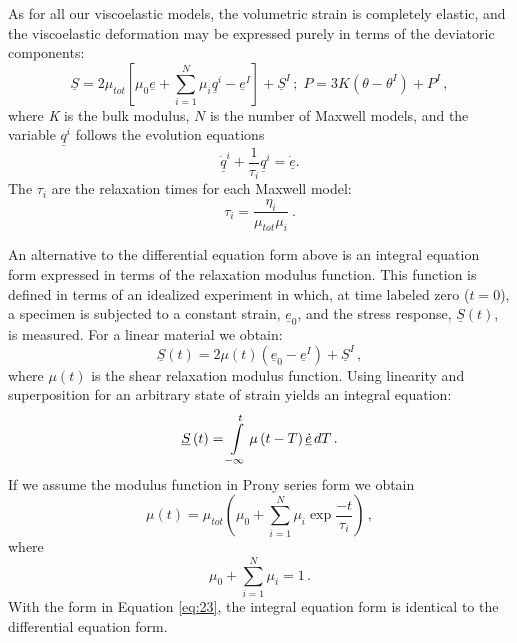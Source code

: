 As for all our viscoelastic models, the volumetric strain is completely
elastic, and the viscoelastic deformation may be expressed purely
in terms of the deviatoric components:
\begin{equation}
\underline{S}=2\mu_{tot}\left[\mu_{0}\underline{e}+\sum_{i=1}^{N}\mu_{i}\underline{q}^{i}-\underline{e}^{I}\right]+\underline{S}^{I}\,;\; P=3K\left(\theta-\theta^{I}\right)+P^{I}\,,\label{eq:19}
\end{equation}
where \textsl{K} is the bulk modulus, $N$ is the number of Maxwell
models, and the variable $\underline{q}^{i}$ follows the evolution
equations
\begin{equation}
\underline{\dot{q}}^{i}+\frac{1}{\tau_{i}}\underline{q}^{i}=\underline{\dot{e}}.\label{eq:20}
\end{equation}
The $\tau_{i}$ are the relaxation times for each Maxwell model:
\begin{equation}
\tau_{i}=\frac{\eta_{i}}{\mu_{tot}\mu_{i}}\:.\label{eq:21-1}
\end{equation}


An alternative to the differential equation form above is an integral
equation form expressed in terms of the relaxation modulus function.
This function is defined in terms of an idealized experiment in which,
at time labeled zero ($t=0$), a specimen is subjected to a constant
strain, $\underline{e}_{0}$, and the stress response, $\underline{S}\left(t\right)$,
is measured. For a linear material we obtain:
\begin{equation}
\underline{S}\left(t\right)=2\mu\left(t\right)\left(\underline{e}_{0}-\underline{e}^{I}\right)+\underline{S}^{I}\,,\label{eq:21}
\end{equation}
where $\mu\left(t\right)$ is the shear relaxation modulus function.
Using linearity and superposition for an arbitrary state of strain
yields an integral equation:
\begin{equation}
\underline{S}\left(t\right)=\intop_{-\infty}^{t}\mu\left(t-T\right)\underline{\dot{e}}\, dT\,.\label{eq:22}
\end{equation}
If we assume the modulus function in Prony series form we obtain
\begin{equation}
\mu\left(t\right)=\mu_{tot}\left(\mu_{0}+\sum_{i=1}^{N}\mu_{i}\exp\frac{-t}{\tau_{i}}\right)\,,\label{eq:23}
\end{equation}
where
\begin{equation}
\mu_{0}+\sum_{i=1}^{N}\mu_{i}=1\,.\label{eq:24}
\end{equation}
With the form in Equation \ref{eq:23}, the integral equation form
is identical to the differential equation form.

